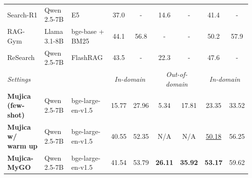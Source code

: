 \begin{table}[h!]
\begin{tabular}{lllcccccc}
Search-R1 & Qwen 2.5-7B & E5 & 37.0 & - & 14.6 & - & 41.4 & - \\
RAG-Gym                                     & Llama 3.1-8B                                  & bge-base + BM25                                & 44.1                      & 56.8                           & -                          & -                          & 50.2                          & 57.9            \\
ReSearch                                    & Qwen 2.5-7B                                   & FlashRAG                                     & 43.5                      & -                               & 22.3                       & -                          & 47.6                          & -                         \\
\midrule
\textit{Settings}         & & & \multicolumn{2}{c}{\textit{In-domain}} & \multicolumn{2}{c}{\textit{Out-of-domain}} & \multicolumn{2}{c}{\textit{In-domain}}  \\ 
\textbf{Mujica (few-shot)}                  & Qwen 2.5-7B                                   & bge-large-en-v1.5                              & 15.77 & 27.96 & 5.34   & 17.81  & 23.35    & 33.52 \\
\textbf{Mujica w/ warm up}                      & Qwen 2.5-7B                                   & bge-large-en-v1.5                              & 40.55                     & 52.35                           & N/A                        & N/A                        & \underline{50.18}                         & 56.25                     \\
\textbf{Mujica-MyGO}                        & Qwen 2.5-7B                                   & bge-large-en-v1.5                              & 41.54                     & 53.79                           & \textbf{26.11}             & \textbf{35.92}             & \textbf{53.17}                & 59.62               \\
\bottomrule
\end{tabular}
\label{exp_baselines}
\end{table}


